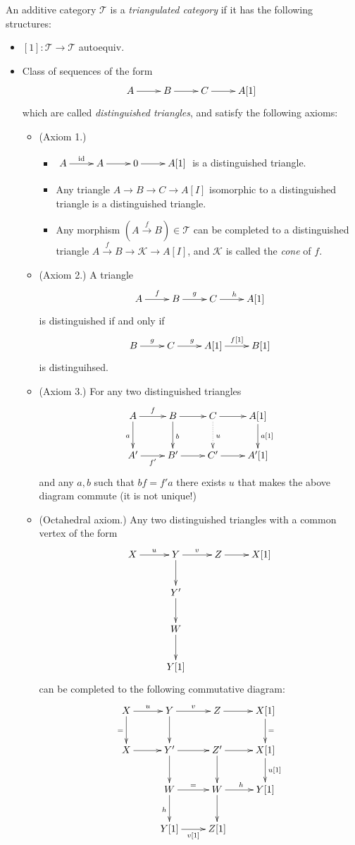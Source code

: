 \begin{definition}
\label{definition-triangulated-category}
An additive category $\mathcal{T}$ is a {\it triangulated category} if it has
the following structures:
\begin{itemize}
\item $[1]:\mathcal{T} \to \mathcal{T}$ autoequiv.
\item Class of sequences of the form
$$
\xymatrix{
A\ar[r]&B\ar[r]&C\ar[r]&A[1]
}
$$
which are called {\it distinguished triangles}, and satisfy the following
axioms:
\begin{itemize}
\item (Axiom 1.)
\begin{itemize}
\item $\xymatrix{
A\ar[r]^{\text{id}}&A \ar[r]& 0\ar[r]&A[1]
}$ is a distinguished triangle.
\item Any triangle $A \to B \to C \to A[I]$ isomorphic to a distinguished
triangle is a distinguished triangle.
\item Any morphism $(A \xrightarrow{f}B)\in \mathcal{T}$ can be completed to a
distinguished triangle $A\xrightarrow{f}B \to \mathcal{K} \to A[I]$, and
$\mathcal{K}$ is called the {\it cone} of $f$.
\end{itemize}
\item (Axiom 2.) A triangle
$$
\xymatrix{
A\ar[r]^f &  B \ar[r]^g &  C\ar[r]^h & A[1]
}
$$
is distinguished if and only if
$$
\xymatrix{
B\ar[r]^g &  C \ar[r]^g &  A[1]\ar[r]^{f[1]} & B[1]
}
$$
is distinguihsed.

\item (Axiom 3.) For any two distinguished triangles
$$
\xymatrix{
A\ar[r]^f\ar[d]_a &  B \ar[r]\ar[d]^b &  C \ar@{.>}[d]^{u}\ar[r]& 
A[1]\ar[d]^{a[1]}\\
A'\ar[r]_{f'}& B'\ar[r]& C'\ar[r]&A'[1]
}
$$
and any $a,b$ such that $bf=f'a$ there exists $u$ that makes the above diagram
commute (it is not unique!)

\item (Octahedral axiom.) Any two distinguished triangles with a common vertex 
of the form 
$$
\xymatrix{
X\ar[r]^u& Y\ar[r]^v\ar[d]& Z\ar[r]&X[1]\\
& Y'\ar[d]\\
& W\ar[d]\\
& Y[1]
}
$$
can be
completed to the following commutative diagram:
$$
\xymatrix{
X\ar[d]_{=}\ar[r]^u& Y\ar[r]^v\ar[d]&  Z\ar[r]&  X[1]\ar[d]^=\\
X\ar[r]&  Y'\ar[d]\ar[r]&  Z'\ar[d]\ar[r]& X[1]\ar[d]^{u[1]}\\
& W\ar[r]^=\ar[d]_h & W\ar[r]^h\ar[d]&  Y[1]\\
& Y[1]\ar[r]_{v[1]}&Z[1]
}
$$
\end{itemize}
\end{itemize}
\end{definition}


